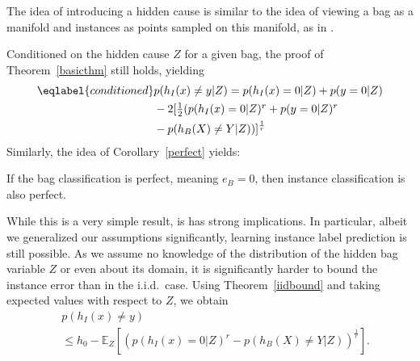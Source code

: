 The idea of introducing a hidden cause is similar to the idea of viewing a bag as a manifold and instances as points
sampled on this manifold, as in \citet{ICML2011Babenko_74}.

Conditioned on the hidden cause $Z$ for a given bag, the proof of Theorem~\ref{basicthm} still holds, yielding
\begin{align}\eqlabel{conditioned}
&p(h_I(x) \neq y | Z) =p(h_I(x)=0|Z) + p(y=0|Z)\\
&\textstyle- 2  [\frac{1}{2} ( p(h_I(x)=0|Z)^r + p(y=0|Z)^r\\
& - p(h_B(X) \neq Y|Z)) ]^\frac{1}{r}
\end{align}
Similarly, the idea of Corollary~\ref{perfect} yields:

\begin{corollary}\label{perfect}
If the bag classification is perfect, meaning $e_B=0$, then instance classification is also perfect.
\end{corollary}

While this is a very simple result, is has strong implications. In particular, albeit we generalized our
assumptions significantly, learning instance label prediction is still possible.
As we assume no knowledge of the distribution of the hidden bag variable $Z$ or even about its domain, it is significantly harder
to bound the instance error than in the i.i.d.\ case.
Using Theorem~\ref{iidbound} and taking expected values with respect to $Z$, we obtain
\begin{align}
    & p(h_I(x)\neq y) \\\
    & \leq h_0 - \mathbb{E}_Z \left [\left ( p(h_I(x)=0 | Z)^r - p(h_B(X)\neq Y|Z) \right ) ^ \frac{1}{r} \right ].
\end{align}


